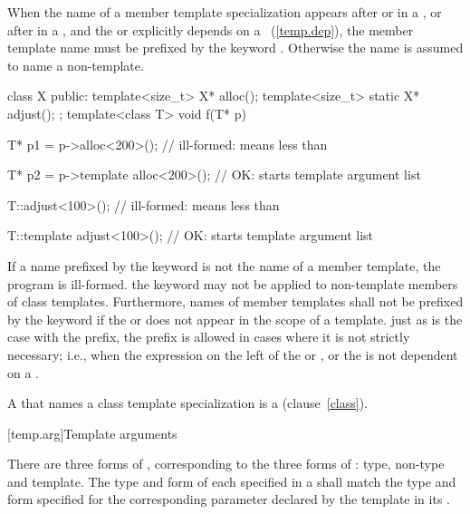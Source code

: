 \pnum
When the name of a member template specialization appears after
or
\tcode{->}
in a
,
or after
in a
,
and the
or
explicitly depends on a
~(\ref{temp.dep}),
the member template name must be prefixed by the keyword
.
Otherwise the name is assumed to name a non-template.
\enterexample

\begin{codeblock}
class X {
public:
	template<size_t> X* alloc();
	template<size_t> static X* adjust();
};
template<class T> void f(T* p)
{
	T* p1 = p->alloc<200>();
		// ill-formed: \tcode{<} means less than

	T* p2 = p->template alloc<200>();
		// OK: \tcode{<} starts template argument list

	T::adjust<100>();
		// ill-formed: \tcode{<} means less than

	T::template adjust<100>();
		// OK: \tcode{<} starts template argument list
}
\end{codeblock}
\exitexampleb

\pnum
If a name prefixed by the keyword
is not the name of a member template, the program is ill-formed.
\enternote
the keyword
may not be applied to non-template members of class templates.
\exitnote
Furthermore, names of member templates shall not be prefixed by the keyword
if the  or 
does not appear in the scope of a template.
\enternote
just as is the case with the
prefix, the
prefix is allowed in cases where it is not strictly
necessary; i.e., when the expression on the left of the
\tcode{->}
or
, or the 
is not dependent on a
.
\exitnote

\pnum
{}%
A
that names a class template specialization is a
(clause~\ref{class}).

[temp.arg]{Template arguments}

\pnum
{}%
There are three forms of
,
corresponding to the three forms of
:
type, non-type and template.
The type and form of each
specified in a
shall match the type and form specified for the corresponding
parameter declared by the template in its
.
\enterexample

